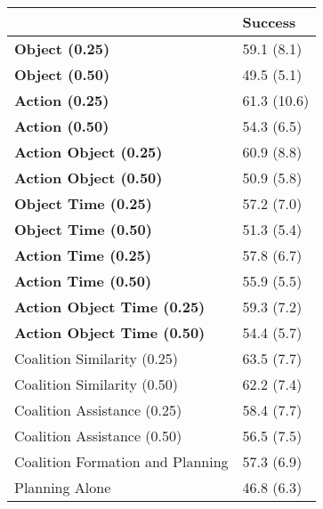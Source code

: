 \begin{tabular}{ll}
\hline
                                    & Success     \\
\hline
 \textbf{Object (0.25)}             & 59.1 (8.1)  \\
 \textbf{Object (0.50)}             & 49.5 (5.1)  \\
 \textbf{Action (0.25)}             & 61.3 (10.6) \\
 \textbf{Action (0.50)}             & 54.3 (6.5)  \\
 \textbf{Action Object (0.25)}      & 60.9 (8.8)  \\
 \textbf{Action Object (0.50)}      & 50.9 (5.8)  \\
 \textbf{Object Time (0.25)}        & 57.2 (7.0)  \\
 \textbf{Object Time (0.50)}        & 51.3 (5.4)  \\
 \textbf{Action Time (0.25)}        & 57.8 (6.7)  \\
 \textbf{Action Time (0.50)}        & 55.9 (5.5)  \\
 \textbf{Action Object Time (0.25)} & 59.3 (7.2)  \\
 \textbf{Action Object Time (0.50)} & 54.4 (5.7)  \\
 Coalition Similarity (0.25)        & 63.5 (7.7)  \\
 Coalition Similarity (0.50)        & 62.2 (7.4)  \\
 Coalition Assistance (0.25)        & 58.4 (7.7)  \\
 Coalition Assistance (0.50)        & 56.5 (7.5)  \\
 Coalition Formation and Planning   & 57.3 (6.9)  \\
 Planning Alone                     & 46.8 (6.3)  \\
\hline
\end{tabular}
